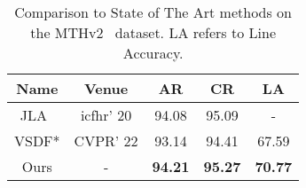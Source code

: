 \begin{table}[]
    \centering
    \caption{Comparison to State of The Art methods on the MTHv2~\cite{jla} dataset. LA refers to Line Accuracy.}

    \begin{tabular}{c|c|ccc}
        \hline
         Name & Venue & AR & \textbf{CR} & LA \\
         \hline
         JLA~\cite{jla}& icfhr' 20&94.08 & 95.09 & -\\
         \hline
         VSDF*\cite{vsdf}& CVPR' 22 &93.14 &94.41 &67.59 \\
         \hline
         Ours&- &\textbf{94.21} & \textbf{95.27} & \textbf{70.77} \\
        \hline
    \end{tabular}
    \label{tab:my_label}
\end{table}